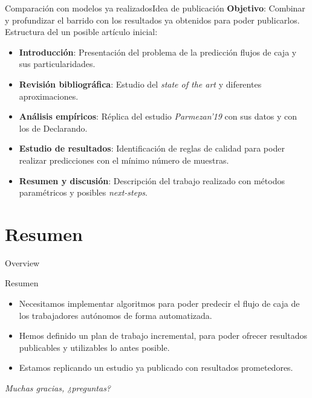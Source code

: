 \documentclass[12pt, aspectratio=169]{beamer} %
\begin{document}
\begin{frame}{Comparación con modelos ya realizados}{Idea de publicación}
  \textbf{Objetivo}: Combinar y profundizar el barrido con los resultados ya obtenidos para poder publicarlos.
  Estructura del un posible artículo inicial:
  \begin{itemize}
  \item \textbf{Introducción}: Presentación del problema de la predicción flujos de caja y sus particularidades.
  \item \textbf{Revisión bibliográfica}: Estudio del \textit{state of the art} y diferentes aproximaciones.
  \item \textbf{Análisis empíricos}: Réplica del estudio \textit{Parmezan'19} con sus datos y con los de Declarando.
  \item \textbf{Estudio de resultados}: Identificación de reglas de calidad para poder realizar predicciones con el mínimo número de muestras.
  \item \textbf{Resumen y discusión}: Descripción del trabajo realizado con métodos paramétricos y posibles \textit{next-steps}.
  \end{itemize}
\end{frame}



\section{Resumen}

\begin{frame}{Overview}
\tableofcontents
\end{frame}


\begin{frame}{Resumen}
  \begin{itemize}
  \item Necesitamos implementar algoritmos para poder predecir el flujo de caja de los trabajadores autónomos de forma automatizada.
  \item Hemos definido un plan de trabajo incremental, para poder ofrecer resultados publicables y utilizables lo antes posible.
  \item Estamos replicando un estudio ya publicado con resultados prometedores.
  \end{itemize}
\end{frame}


\begin{frame}{}
  \centering \Large
  \emph{Muchas gracias, ¿preguntas?}
\end{frame}
\end{document}
